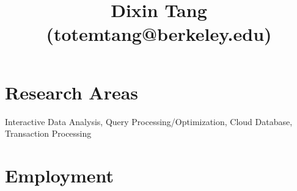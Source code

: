 \documentclass[10pt]{article} %
\begin{document}

\title{Dixin Tang {\small (totemtang@berkeley.edu)}} %

%
\vspace{-10mm}

\section{Research Areas}

Interactive Data Analysis, Query Processing/Optimization, Cloud Database, Transaction Processing

\vspace{-5mm}

\section{Employment}


\vspace{-7mm}
\end{document}
